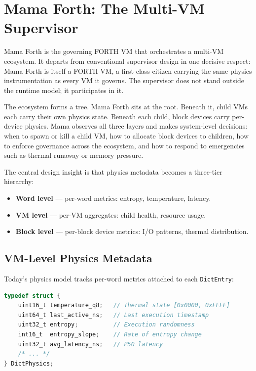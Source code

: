
\section{Mama Forth: The Multi-VM Supervisor}

Mama Forth is the governing FORTH VM that orchestrates a multi-VM ecosystem.
It departs from conventional supervisor design in one decisive respect: Mama
Forth is itself a FORTH VM, a first-class citizen carrying the same physics
instrumentation as every VM it governs. The supervisor does not stand outside
the runtime model; it participates in it.

The ecosystem forms a tree. Mama Forth sits at the root. Beneath it, child VMs
each carry their own physics state. Beneath each child, block devices carry
per-device physics. Mama observes all three layers and makes system-level
decisions: when to spawn or kill a child VM, how to allocate block devices to
children, how to enforce governance across the ecosystem, and how to respond to
emergencies such as thermal runaway or memory pressure.

The central design insight is that physics metadata becomes a three-tier
hierarchy:

\begin{itemize}
  \item \textbf{Word level} --- per-word metrics: entropy, temperature, latency.
  \item \textbf{VM level} --- per-VM aggregates: child health, resource usage.
  \item \textbf{Block level} --- per-block device metrics: I/O patterns, thermal
        distribution.
\end{itemize}

\subsection{VM-Level Physics Metadata}

Today's physics model tracks per-word metrics attached to each \texttt{DictEntry}:

\begin{lstlisting}[language=C]
typedef struct {
    uint16_t temperature_q8;   // Thermal state [0x0000, 0xFFFF]
    uint64_t last_active_ns;   // Last execution timestamp
    uint32_t entropy;          // Execution randomness
    int16_t  entropy_slope;    // Rate of entropy change
    uint32_t avg_latency_ns;   // P50 latency
    /* ... */
} DictPhysics;
\end{lstlisting}

